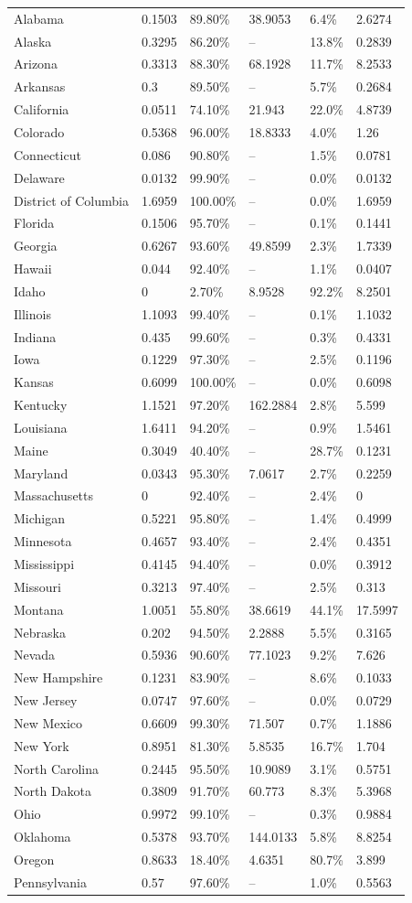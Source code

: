 \begin{longtable}[c]{p{1.0in}p{1.0in}p{1.0in}p{1.0in}p{1.0in}p{1.0in}}
Alabama & 0.1503 & 89.80\% & 38.9053 & 6.4\% & 2.6274 \tabularnewline
Alaska & 0.3295 & 86.20\% & -- & 13.8\% & 0.2839 \tabularnewline
Arizona & 0.3313 & 88.30\% & 68.1928 & 11.7\% & 8.2533 \tabularnewline
Arkansas & 0.3 & 89.50\% & -- & 5.7\% & 0.2684 \tabularnewline
California & 0.0511 & 74.10\% & 21.943 & 22.0\% & 4.8739 \tabularnewline
Colorado & 0.5368 & 96.00\% & 18.8333 & 4.0\% & 1.26 \tabularnewline
Connecticut & 0.086 & 90.80\% & -- & 1.5\% & 0.0781 \tabularnewline
Delaware & 0.0132 & 99.90\% & -- & 0.0\% & 0.0132 \tabularnewline
District of Columbia & 1.6959 & 100.00\% & -- & 0.0\% & 1.6959 \tabularnewline
Florida & 0.1506 & 95.70\% & -- & 0.1\% & 0.1441 \tabularnewline
Georgia & 0.6267 & 93.60\% & 49.8599 & 2.3\% & 1.7339 \tabularnewline
Hawaii & 0.044 & 92.40\% & -- & 1.1\% & 0.0407 \tabularnewline
Idaho & 0 & 2.70\% & 8.9528 & 92.2\% & 8.2501 \tabularnewline
Illinois & 1.1093 & 99.40\% & -- & 0.1\% & 1.1032 \tabularnewline
Indiana & 0.435 & 99.60\% & -- & 0.3\% & 0.4331 \tabularnewline
Iowa & 0.1229 & 97.30\% & -- & 2.5\% & 0.1196 \tabularnewline
Kansas & 0.6099 & 100.00\% & -- & 0.0\% & 0.6098 \tabularnewline
Kentucky & 1.1521 & 97.20\% & 162.2884 & 2.8\% & 5.599 \tabularnewline
Louisiana & 1.6411 & 94.20\% & -- & 0.9\% & 1.5461 \tabularnewline
Maine & 0.3049 & 40.40\% & -- & 28.7\% & 0.1231 \tabularnewline
Maryland & 0.0343 & 95.30\% & 7.0617 & 2.7\% & 0.2259 \tabularnewline
Massachusetts & 0 & 92.40\% & -- & 2.4\% & 0 \tabularnewline
Michigan & 0.5221 & 95.80\% & -- & 1.4\% & 0.4999 \tabularnewline
Minnesota & 0.4657 & 93.40\% & -- & 2.4\% & 0.4351 \tabularnewline
Mississippi & 0.4145 & 94.40\% & -- & 0.0\% & 0.3912 \tabularnewline
Missouri & 0.3213 & 97.40\% & -- & 2.5\% & 0.313 \tabularnewline
Montana & 1.0051 & 55.80\% & 38.6619 & 44.1\% & 17.5997 \tabularnewline
Nebraska & 0.202 & 94.50\% & 2.2888 & 5.5\% & 0.3165 \tabularnewline
Nevada & 0.5936 & 90.60\% & 77.1023 & 9.2\% & 7.626 \tabularnewline
New Hampshire & 0.1231 & 83.90\% & -- & 8.6\% & 0.1033 \tabularnewline
New Jersey & 0.0747 & 97.60\% & -- & 0.0\% & 0.0729 \tabularnewline
New Mexico & 0.6609 & 99.30\% & 71.507 & 0.7\% & 1.1886 \tabularnewline
New York & 0.8951 & 81.30\% & 5.8535 & 16.7\% & 1.704 \tabularnewline
North Carolina & 0.2445 & 95.50\% & 10.9089 & 3.1\% & 0.5751 \tabularnewline
North Dakota & 0.3809 & 91.70\% & 60.773 & 8.3\% & 5.3968 \tabularnewline
Ohio & 0.9972 & 99.10\% & -- & 0.3\% & 0.9884 \tabularnewline
Oklahoma & 0.5378 & 93.70\% & 144.0133 & 5.8\% & 8.8254 \tabularnewline
Oregon & 0.8633 & 18.40\% & 4.6351 & 80.7\% & 3.899 \tabularnewline
Pennsylvania & 0.57 & 97.60\% & -- & 1.0\% & 0.5563 \tabularnewline

\end{longtable}

